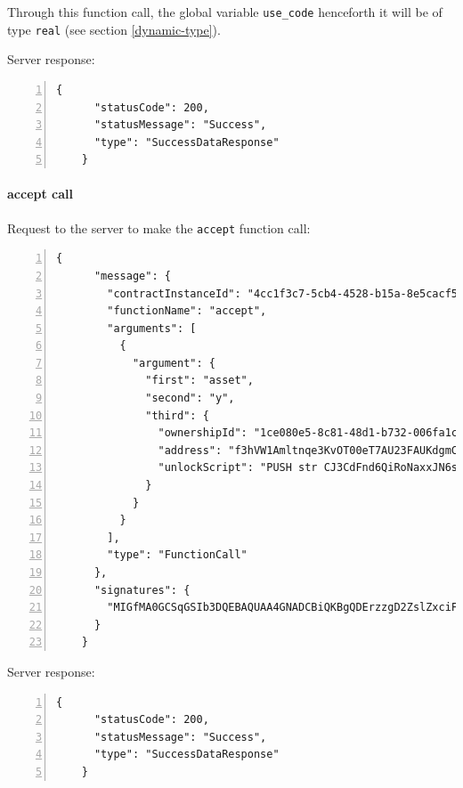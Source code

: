 Through this function call, the global variable \verb|use_code| henceforth it will be of type \verb|real| 
(see section \ref{dynamic-type}).

Server response:
{
  \small
  \begin{Verbatim}[numbers=left,xleftmargin=1cm,firstnumber=1,breaklines=true,breakanywhere=true,tabsize=2]
    {
      "statusCode": 200,
      "statusMessage": "Success",
      "type": "SuccessDataResponse"
    }
  \end{Verbatim}
}

\paragraph{accept call}

Request to the server to make the \verb|accept| function call:
{
  \small
  \begin{Verbatim}[numbers=left,xleftmargin=1cm,firstnumber=1,breaklines=true,breakanywhere=true,tabsize=2]
    {
      "message": {
        "contractInstanceId": "4cc1f3c7-5cb4-4528-b15a-8e5cacf5b18a",
        "functionName": "accept",
        "arguments": [
          {
            "argument": {
              "first": "asset",
              "second": "y",
              "third": {
                "ownershipId": "1ce080e5-8c81-48d1-b732-006fa1cc4e2e",
                "address": "f3hVW1Amltnqe3KvOT00eT7AU23FAUKdgmCluZB+nss=",
                "unlockScript": "PUSH str CJ3CdFnd6QiRoNaxxJN6sEYkmhKsSKi0SP5YXiSGhygZs+EMyE2bPrI+hRL4PSA0vLh0X6PNpDhTaPxx4kc1LEk9su8+6kkDvi3xpLG9bDoPjss+LEPXUjPTcGVB/3jITb8W+GmX1kDYhGHKtSuhvxBjTwwbtok4gRDD1BcMX/o=\nPUSH str MIGfMA0GCSqGSIb3DQEBAQUAA4GNADCBiQKBgQDErzzgD2ZslZxciFAiX3/ot7lrkZDw4148jFZrsDZPE6CVs9xXFSHGgy/mFvIFLXhnChO6Nyd2be3lbgeavLMCMVUiTStXr117Km17keWpb3sItkKKsLFBOcIIU8XXowI/OhzQN2XPZYESHgjdQ5vwEj2YyueiS7WKP94YWz/pswIDAQAB\n"
              }
            }
          }
        ],
        "type": "FunctionCall"
      },
      "signatures": {
        "MIGfMA0GCSqGSIb3DQEBAQUAA4GNADCBiQKBgQDErzzgD2ZslZxciFAiX3/ot7lrkZDw4148jFZrsDZPE6CVs9xXFSHGgy/mFvIFLXhnChO6Nyd2be3lbgeavLMCMVUiTStXr117Km17keWpb3sItkKKsLFBOcIIU8XXowI/OhzQN2XPZYESHgjdQ5vwEj2YyueiS7WKP94YWz/pswIDAQAB": "wL3r61IgwBGau7S7V967ZSA8B0lLiOMi0qai1YGQVFXnCTvL9WDVMGTwp7XXAQ77f23Hw5y6Ho5SFUMRRfaTLguIJBx9twRSUfpTP4bh3K4RB2yg32rkOP16G2vIfEirTT+v2wmp1f10pY+dY/QdMzua7EFdQNmL7PhJnA96CpM="
      }
    }
  \end{Verbatim}
}

Server response:
{
  \small
  \begin{Verbatim}[numbers=left,xleftmargin=1cm,firstnumber=1,breaklines=true,breakanywhere=true,tabsize=2]
    {
      "statusCode": 200,
      "statusMessage": "Success",
      "type": "SuccessDataResponse"
    }
  \end{Verbatim}
}

